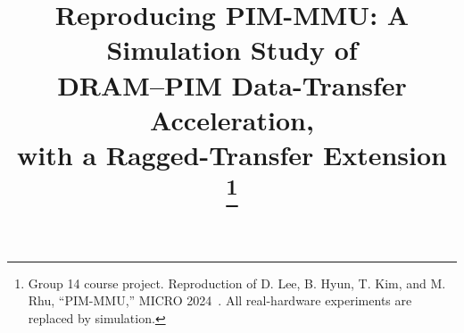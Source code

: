 \documentclass[conference]{IEEEtran}
\begin{document}
\title{Reproducing PIM-MMU: A Simulation Study of \\ DRAM--PIM Data-Transfer Acceleration, \\ with a Ragged-Transfer Extension
\thanks{Group 14 course project. Reproduction of D. Lee, B. Hyun, T. Kim, and
M. Rhu, ``PIM-MMU,'' MICRO 2024~\cite{pimmmu}. All real-hardware experiments are
replaced by simulation.}}

\author{
\and
{}
\and
{}
\and
{}
}
\maketitle
\end{document}
